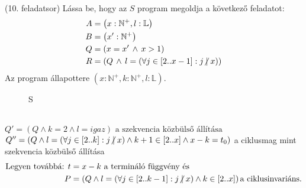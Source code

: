 \documentclass[a4paper,12pt]{article}
\theoremstyle{definition}
\begin{document}
		\newpage
\begin{question}(10. feladatsor)
	Lássa be, hogy az $S$ program megoldja a következő feladatot:
	\begin{align*}
		A &= \left( x: \mathbb{N}^+, l: \mathbb{L} \right) \\
		B &= \left( x': \mathbb{N}^+ \right) \\
		Q &= (x = x' \, \land \, x > 1) \\
		R &= (Q \, \land \, l = \left( \forall j \in \left[2..x-1\right]: j \centernot{|} x\right))
	\end{align*}
	Az program állapottere $ \left( x: \mathbb{N}^+, k: \mathbb{N}^+, l: \mathbb{L} \right) $.

	\begin{wrapfigure}[4]{l}{3.5cm}
			\vspace{-2\baselineskip}
		\begin{stuki*}[3.5cm]{S}
			\begin{WHILE}{2}{}
			\end{WHILE}
		\end{stuki*}
	\end{wrapfigure}\leavevmode
	\noindent
	\\[18pt]
	$Q' = \left( Q \land k = 2 \land l = igaz \right) \text{ a szekvencia közbülső állítása}$
	\\[22pt]
	$Q'' = \left( Q \land l = \left( \forall j \in \left[ 2..k\right]: j \centernot{|} x  \right) \land k+1 \in \left[ 2..x \right] \land x-k=t_0 \right) $ a ciklusmag mint szekvencia közbülső állítása
	\\[-10pt]
	\noindent
	\begin{align*}
		\text{Legyen továbbá: } t &= x - k \text{ a termináló függvény és} \\
		P &= \left( Q \land l = \left( \forall j \in \left[ 2..k-1\right]: j \centernot{|} x \right) \land k \in \left[ 2..x \right]  \right) \text{a ciklusinvariáns.}
	\end{align*}
	\end{question}
\end{document}
